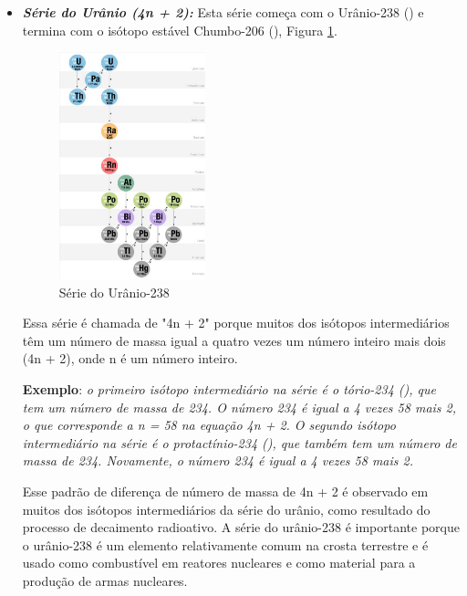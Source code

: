 \documentclass[11pt,a4paper]{article}
\begin{document}
\begin{itemize}
                    \item \textbf{\textit{\textcolor{CarnationPink}{Série do Urânio (4n + 2):}}} Esta série começa com o Urânio-238 () e termina com o isótopo estável Chumbo-206 (), Figura \ref{fig:serieDoUranio}. 
                    
                            \begin{figure}[h]
                                \centering
                                \includegraphics[width=0.4\textwidth]{Imagens/serieDoUranio.jpg}
                                \caption{Série do Urânio-238}
                                \label{fig:serieDoUranio}
                            \end{figure}
                    
                        
                        Essa série é chamada de "4n + 2" porque muitos dos isótopos intermediários têm um número de massa igual a quatro vezes um número inteiro mais dois (4n + 2), onde n é um número inteiro.

                        \textbf{Exemplo}: \textit{o primeiro isótopo intermediário na série é o tório-234 (), que tem um número de massa de 234. O número 234 é igual a 4 vezes 58 mais 2, o que corresponde a n = 58 na equação 4n + 2. O segundo isótopo intermediário na série é o protactínio-234 (), que também tem um número de massa de 234. Novamente, o número 234 é igual a 4 vezes 58 mais 2.}
                    
                        Esse padrão de diferença de número de massa de 4n + 2 é observado em muitos dos isótopos intermediários da série do urânio, como resultado do processo de decaimento radioativo. A série do urânio-238 é importante porque o urânio-238 é um elemento relativamente comum na crosta terrestre e é usado como combustível em reatores nucleares e como material para a produção de armas nucleares.



\end{itemize}
\end{document}

